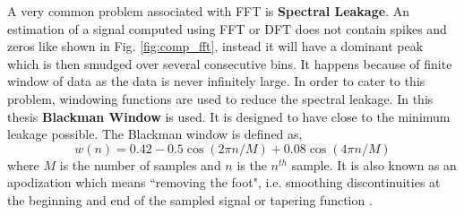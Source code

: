 A very common problem associated with FFT is \textbf{Spectral Leakage}. An estimation of a signal computed using FFT or DFT does not contain spikes and zeros like shown in Fig. \ref{fig:comp_fft}, instead it will have a dominant peak which is then smudged over several consecutive bins. It happens because of finite window of data as the data is never infinitely large. In order to cater to this problem, windowing functions are used to reduce the spectral leakage. In this thesis \textbf{Blackman Window} is used. It is designed to have close to the minimum leakage possible. The Blackman window is defined as,
\begin{equation*}
    w(n) = 0.42 - 0.5\cos(2\pi n/M) + 0.08\cos(4\pi n/M)
\end{equation*}
where \(M\) is the number of samples and \(n\) is the $n^{th}$ sample. It is also known as an apodization which means ``removing the foot", i.e. smoothing discontinuities at the beginning and end of the sampled signal or tapering function \cite{blackman1958measurement}\cite{oppenheim2010discrete}.

